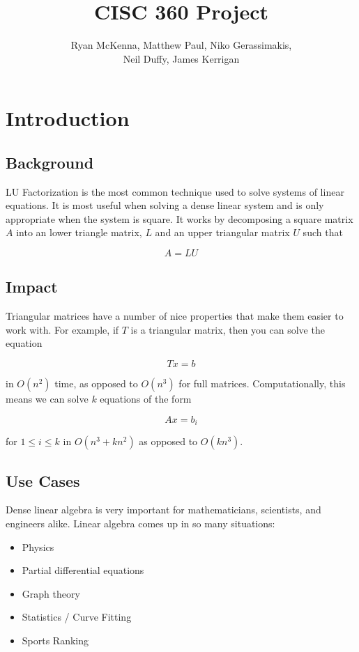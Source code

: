 \documentclass[12]{article}
\title{CISC 360 Project}
\author{Ryan McKenna, Matthew Paul, Niko Gerassimakis,\\ Neil Duffy, James Kerrigan}
\begin{document}
\maketitle

\section{Introduction}

\subsection{Background}

LU Factorization is the most common technique used to solve systems of linear equations.  It is most useful when solving a dense linear system and is only appropriate when the system is square.  It works by decomposing a square matrix $A$ into an lower triangle matrix, $L$ and an upper triangular matrix $U$ such that 

$$ A = LU $$

\subsection{Impact}

Triangular matrices have a number of nice properties that make them easier to work with.  For example, if $ T $ is a triangular matrix, then you can solve the equation

$$ T x = b $$ 

in $O(n^2)$ time, as opposed to $O(n^3)$ for full matrices.  Computationally, this means we can solve $k$ equations of the form 

$$ A x = b_i $$

for $ 1 \leq i \leq k $ in $ O(n^3 + k n^2) $ as opposed to $ O(k n^3) $.

\subsection{Use Cases}

Dense linear algebra is very important for mathematicians, scientists, and engineers alike.  Linear algebra comes up in so many situations:

\begin{itemize}
\item Physics
\item Partial differential equations
\item Graph theory
\item Statistics / Curve Fitting
\item Sports Ranking
\end{itemize}
\end{document}
